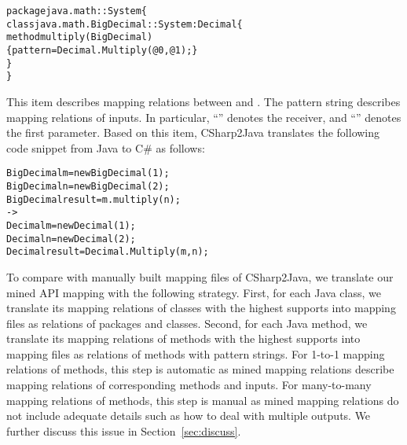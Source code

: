 \begin{CodeOut}\vspace*{-1ex}
\begin{alltt}
package java.math :: System \{
  class java.math.BigDecimal :: System:Decimal \{
    method multiply(BigDecimal)
       \{ pattern =  Decimal.Multiply(@0, @1); \}
  \}
\}
\end{alltt}
\end{CodeOut}\vspace*{-1ex}

This item describes mapping relations between  and . The
pattern string describes mapping relations of inputs. In particular,
``'' denotes the receiver, and ``'' denotes
the first parameter. Based on this item, CSharp2Java translates the
following code snippet from Java to C\# as follows:

\begin{CodeOut}\vspace*{-1ex}
\begin{alltt}
  BigDecimal m = new BigDecimal(1);
  BigDecimal n = new BigDecimal(2);
  BigDecimal result = m.multiply(n);
  ->
  Decimal m = new Decimal(1);
  Decimal n = new Decimal(2);
  Decimal result = Decimal.Multiply(m,n);
\end{alltt}
\end{CodeOut}\vspace*{-1ex}

To compare with manually built mapping files of CSharp2Java, we
translate our mined API mapping with the following strategy. First,
for each Java class, we translate its mapping relations of classes
with the highest supports into mapping files as relations of
packages and classes. Second, for each Java method, we translate its
mapping relations of methods with the highest supports into mapping
files as relations of methods with pattern strings. For 1-to-1
mapping relations of methods, this step is automatic as mined
mapping relations describe mapping relations of corresponding
methods and inputs. For many-to-many mapping relations of methods,
this step is manual as mined mapping relations do not include
adequate details such as how to deal with multiple outputs. We
further discuss this issue in Section~\ref{sec:discuss}.

